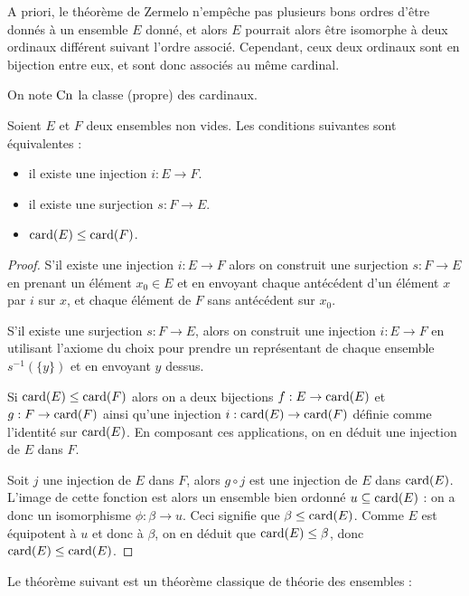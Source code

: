 \begin{rmk}
    A priori, le théorème de Zermelo n'empêche pas plusieurs bons ordres d'être donnés à un ensemble $E$ donné, et alors $E$ pourrait alors être isomorphe à deux ordinaux différent suivant l'ordre associé. Cependant, ceux deux ordinaux sont en bijection entre eux, et sont donc associés au même cardinal.
\end{rmk}

On note $\mathrm{Cn}$ la classe (propre) des cardinaux.

\begin{prop}
    Soient $E$ et $F$ deux ensembles non vides. Les conditions suivantes sont équivalentes :
    \begin{itemize}[label=$\bullet$]
        \item il existe une injection $i : E \to F$.
        \item il existe une surjection $s : F \to E$.
        \item $\mathrm{card}(E)\leq \mathrm{card}(F)$.
    \end{itemize}
\end{prop}

\begin{proof}
    S'il existe une injection $i : E \to F$ alors on construit une surjection $s : F \to E$ en prenant un élément $x_0\in E$ et en envoyant chaque antécédent d'un élément $x$ par $i$ sur $x$, et chaque élément de $F$ sans antécédent sur $x_0$.

    S'il existe une surjection $s : F \to E$, alors on construit une injection $i : E \to F$ en utilisant l'axiome du choix pour prendre un représentant de chaque ensemble $s^{-1}(\{y\})$ et en envoyant $y$ dessus.

    Si $\mathrm{card}(E)\leq \mathrm{card}(F)$ alors on a deux bijections $f : E \to \mathrm{card}(E)$ et $g : F \to \mathrm{card}(F)$ ainsi qu'une injection $i : \mathrm{card}(E)\to \mathrm{card}(F) $ définie comme l'identité sur $\mathrm{card}(E)$. En composant ces applications, on en déduit une injection de $E$ dans $F$.

    Soit $j$ une injection de $E$ dans $F$, alors $g\circ j$ est une injection de $E$ dans $\mathrm{card}(E)$. L'image de cette fonction est alors un ensemble bien ordonné $u\subseteq \mathrm{card}(E)$ : on a donc un isomorphisme $\phi : \beta\to u$. Ceci signifie que $\beta \leq \mathrm{card}(E)$. Comme $E$ est équipotent à $u$ et donc à $\beta$, on en déduit que $\mathrm{card}(E)\leq \beta$, donc $\mathrm{card}(E)\leq \mathrm{card}(E)$.
\end{proof}

Le théorème suivant est un théorème classique de théorie des ensembles :

